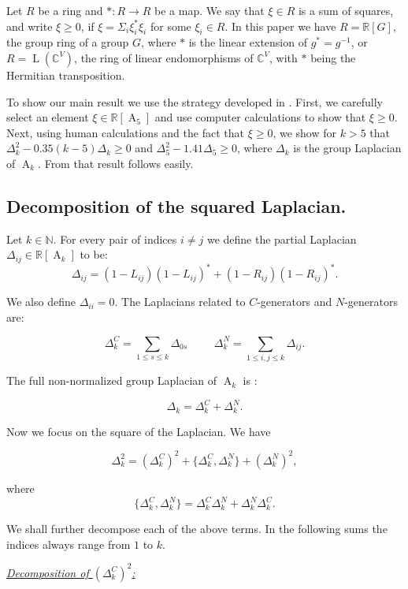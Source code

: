 \documentclass[12pt]{amsart}
\theoremstyle{definition}
\numberwithin{figure}{section}
\numberwithin{table}{section}
\numberwithin{equation}{section}
\newcommand{\OP}[1]{\operatorname{#1}}
\newcommand{\A}{\operatorname{A}}
\newcommand{\BB}[1]{{\mathbb #1}}
\begin{document}
Let $R$ be a ring and $* \colon R \to R$ be a map. We say that $\xi \in R$ is a sum of squares, and write   $\xi \geq 0$, if $\xi = \Sigma_i \xi_i^*\xi_i$ for some $\xi_i \in R$. In this paper we have $R = \BB R[G]$, the group ring of a group $G$, where $*$ is the linear extension of $g^*=g^{-1}$, or $R = \OP{L}(\BB C^V)$, the ring of linear endomorphisms of $\BB C^V$, with $*$ being the Hermitian transposition. 

To show our main result we use the strategy developed in \cite{MR4224715}. First, we carefully select an element $\xi \in \mathbb{R}[\A_5]$ and use computer calculations to show that $\xi\geq 0$. Next, using human calculations and the fact that $\xi \geq 0$, we show for $k> 5$ that $\Delta^2_k - 0.35(k-5)\Delta_k \geq 0$ and $\Delta_5^2-1.41\Delta_5\geq 0$, where $\Delta_k$ is the group Laplacian of $\A_k$. From that result   follows easily. 

\subsection{Decomposition of the squared Laplacian.}\label{ss:decompositions}

Let $k \in \mathbb{N}$. For every pair of indices $i \neq j$ we define the partial Laplacian $\Delta_{ij} \in \mathbb{R}[\A_k]$ to be:
$$\Delta_{ij} = (1-L_{ij})(1-L_{ij})^* + (1-R_{ij})(1-R_{ij})^* .$$ 

We also define $\Delta_{ii} = 0$. The Laplacians related to $C$-generators and $N$-generators are: 

$$
\Delta_k^C = \sum_{1 \leq s \leq k} \Delta_{\mathrm{0}s}
\hspace{1cm}
\Delta_k^N = \sum_{1 \leq i,j \leq k} \Delta_{ij}.
$$

The full non-normalized group Laplacian of $\A_k$ is :

$$
\Delta_k = \Delta_{k}^C + \Delta_k^N.
$$

Now we focus on the square of the Laplacian. We have 

$$
\Delta_k^2 = (\Delta_k^C)^2+ \{\Delta_k^C,\Delta_k^N\}+ (\Delta_k^N)^2,
$$

where 
$$
\{\Delta_k^C,\Delta_k^N\}=\Delta_k^C\Delta_k^N+\Delta_k^N\Delta_k^C.
$$

We shall further decompose each of the above terms. In the following sums the indices always range from $1$ to $k$.

\underline{\textit{Decomposition of $(\Delta_k^C)^2$:}}
\end{document}
